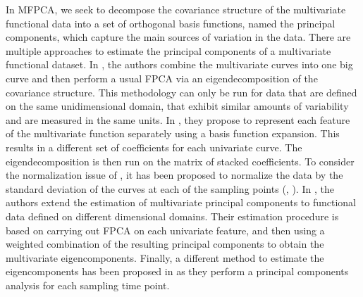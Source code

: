 In MFPCA, we seek to decompose the covariance structure of the multivariate functional data into a set of orthogonal basis functions, named the principal components, which capture the main sources of variation in the data. There are multiple approaches to estimate the principal components of a multivariate functional dataset. In \cite{ramsayFunctionalDataAnalysis2005}, the authors combine the multivariate curves into one big curve and then perform a usual FPCA via an eigendecomposition of the covariance structure. This methodology can only be run for data that are defined on the same unidimensional domain, that exhibit similar amounts of variability and are measured in the same units. In \cite{jacquesModelbasedClusteringMultivariate2014a}, they propose to represent each feature of the multivariate function separately using a basis function expansion. This results in a different set of coefficients for each univariate curve. The eigendecomposition is then run on the matrix of stacked coefficients. To consider the normalization issue of \cite{ramsayFunctionalDataAnalysis2005}, it has been proposed to normalize the data by the standard deviation of the curves at each of the sampling points (\cite{jacquesModelbasedClusteringMultivariate2014a}, \cite{chiouMultivariateFunctionalPrincipal2014}). In \cite{happMultivariateFunctionalPrincipal2018a}, the authors extend the estimation of multivariate principal components to functional data defined on different dimensional domains. Their estimation procedure is based on carrying out FPCA on each univariate feature, and then using a weighted combination of the resulting principal components to obtain the multivariate eigencomponents. Finally, a different method to estimate the eigencomponents has been proposed in \cite{berrenderoPrincipalComponentsMultivariate2011} as they perform a principal components analysis for each sampling time point.

